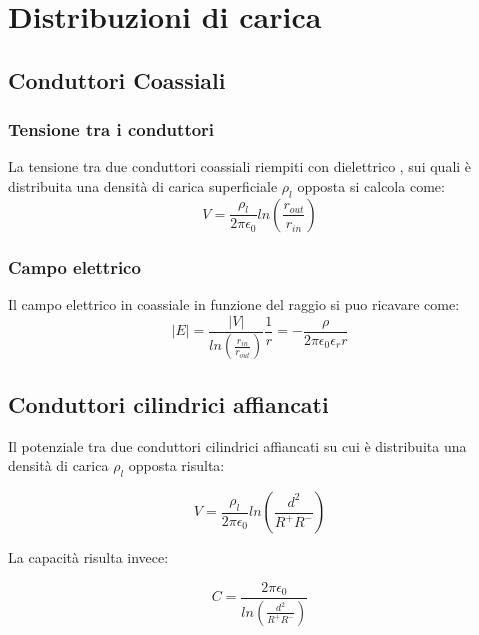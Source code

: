 
\chapter{Distribuzioni di carica}
\label{cap:capitolo1}


	\section{Conduttori Coassiali}
		\subsection{Tensione tra i conduttori}

		La tensione tra due conduttori coassiali riempiti con dielettrico , sui quali è distribuita una densità di carica superficiale $\rho_l$ opposta si calcola come:
		 \begin{equation}
		 V= \frac {\rho_l}  {2 \pi \epsilon_0} ln ( \frac { r_{out} } { r_{in} } )
		 \end{equation}
	
		\subsection{Campo elettrico}

		Il campo elettrico in coassiale in funzione del raggio si puo ricavare come:
		\begin{equation}
		|E|= \frac {|V|} {ln (\frac {r_{in}} {r_{out}} )} \frac {1} {r} = - \frac{\rho}{2 \pi \epsilon_0 \epsilon_r r}
		\label{eq:campoeletricocoassiale}
		\end{equation}


	\section{Conduttori cilindrici affiancati}

		Il potenziale tra due conduttori cilindrici affiancati su cui è distribuita una densità di carica $\rho_l$ opposta risulta:

		\begin{equation}
		V=\frac{\rho_l}{2 \pi \epsilon_0}{ln(\frac{d^2}{R^+R^-})}
		\label{eq:potenzialebifilari}
		\end{equation}

		La capacità risulta invece:

		\begin{equation}
		C=\frac{2 \pi \epsilon_0}{ln(\frac{d^2}{R^+R^-})}
		\end{equation}

